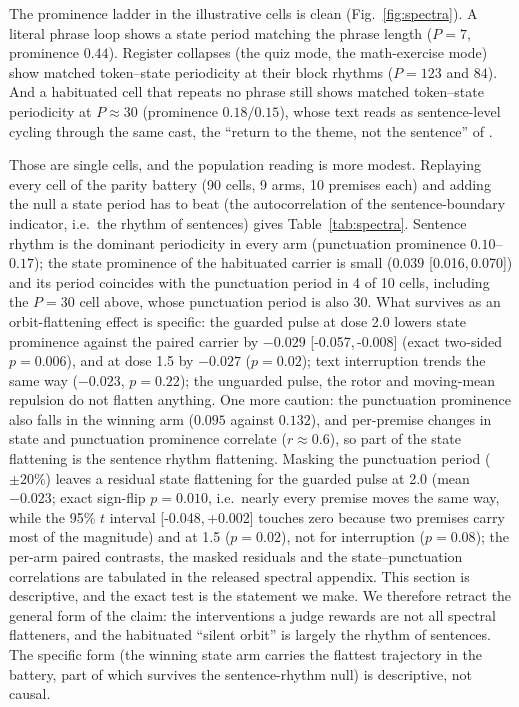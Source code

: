 \documentclass[11pt]{article}
\newcommand{\ci}[2]{[#1,\,#2]}
\begin{document}
The prominence ladder in the illustrative cells is clean
(Fig.~\ref{fig:spectra}). A literal phrase loop shows a state period
matching the phrase length ($P=7$, prominence $0.44$). Register
collapses (the quiz mode, the math-exercise mode) show matched
token--state periodicity at their block rhythms ($P=123$ and $84$). And
a habituated cell that repeats no phrase still shows matched
token--state periodicity at $P\approx 30$ (prominence $0.18/0.15$),
whose text reads as sentence-level cycling through the same cast,
the ``return to the theme, not the sentence'' of
\citet{ono2026interrupting}.

Those are single cells, and the population reading is more modest.
Replaying every cell of the parity battery (90 cells, 9
arms, 10 premises each) and adding the null a state period has to beat
(the autocorrelation of the sentence-boundary indicator, i.e.\ the
rhythm of sentences) gives Table~\ref{tab:spectra}. Sentence rhythm
is the dominant periodicity in every arm (punctuation prominence
$0.10$--$0.17$); the state prominence of the habituated carrier is
small ($0.039$ \ci{0.016}{0.070}) and its period coincides with the
punctuation period in 4 of 10 cells, including the $P{=}30$ cell
above, whose punctuation period is also 30. What survives as an
orbit-flattening effect is specific: the guarded pulse at dose 2.0
lowers state prominence against the paired carrier by $-0.029$
\ci{-0.057}{-0.008} (exact two-sided $p=0.006$), and at dose 1.5 by
$-0.027$ ($p=0.02$); text interruption trends the same way ($-0.023$,
$p=0.22$); the unguarded pulse, the rotor and moving-mean repulsion do
not flatten anything. One more caution: the punctuation prominence
also falls in the winning arm ($0.095$ against $0.132$), and per-premise
changes in state and punctuation prominence correlate ($r \approx 0.6$),
so part of the state flattening is the sentence rhythm flattening.
Masking the punctuation period ($\pm20\%$) leaves a residual state
flattening for the guarded pulse at 2.0 (mean $-0.023$; exact sign-flip
$p=0.010$, i.e.\ nearly every premise moves the same way, while the 95\%
$t$ interval \ci{-0.048}{+0.002} touches zero because two premises
carry most of the magnitude) and at 1.5 ($p=0.02$), not for
interruption ($p=0.08$); the per-arm paired contrasts, the masked
residuals and the state--punctuation correlations are tabulated in the
released spectral appendix. This section is descriptive, and the exact
test is the statement we make. We therefore retract the general form of the claim: the
interventions a judge rewards are not all spectral flatteners, and the
habituated ``silent orbit'' is largely the rhythm of sentences. The
specific form (the winning state arm carries the flattest trajectory
in the battery, part of which survives the sentence-rhythm null) is
descriptive, not causal.
\end{document}
